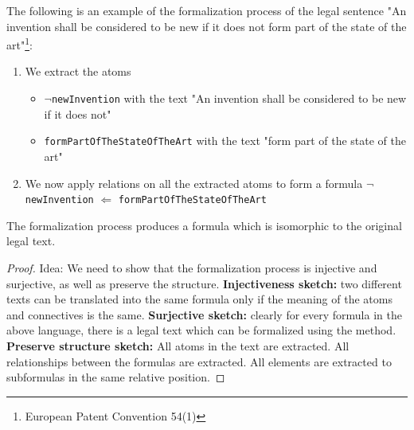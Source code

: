 \begin{example}
    The following is an example of the formalization process of the legal sentence "An invention shall be considered to be new if it does not form part of the state of the art"\footnote{European Patent Convention 54(1)}:
    \begin{enumerate}
        \item We extract the atoms 
        \begin{itemize}
            \item $\neg$\texttt{newInvention} with the text "An invention shall be considered to be new if it does not" 
            \item \texttt{formPartOfTheStateOfTheArt} with the text "form part of the state of the art"
        \end{itemize}
        \item We now apply relations on all the extracted atoms to form a formula $\neg$\texttt{newInvention} $\Leftarrow$ \texttt{formPartOfTheStateOfTheArt}
    \end{enumerate}
\end{example}


\begin{claim}
The formalization process produces a formula which is isomorphic to the original legal text.
\end{claim}
\begin{proof}
    Idea: We need to show that the formalization process is injective and surjective, as well as preserve the structure.
    {\bf Injectiveness sketch:} two different texts can be translated into the same formula only if the meaning of the atoms and connectives is the same.
    {\bf Surjective sketch:} clearly for every formula in the above language, there is a legal text which can be formalized using the method.
    {\bf Preserve structure sketch:} All atoms in the text are extracted. All relationships between the formulas are extracted. All elements are extracted to subformulas in the same relative position. 
\end{proof}
